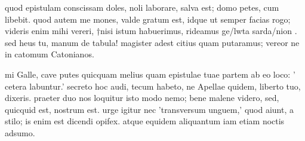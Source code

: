 


 quod epistulam conscissam doles, noli laborare, salva est; domo petes, cum libebit. quod autem me mones, valde gratum est, idque ut semper facias rogo; videris enim mihi vereri, †nisi istum habuerimus, rideamus ge/lwta sarda/nion . sed heus tu, manum de tabula! magister adest citius quam putaramus; vereor ne in catomum Catonianos.

 mi Galle, cave putes quicquam melius quam epistulae tuae partem ab eo loco: ' cetera labuntur.' secreto hoc audi, tecum habeto, ne Apellae quidem, liberto tuo, dixeris. praeter duo nos loquitur isto modo nemo; bene malene videro, sed, quicquid est, nostrum est. urge igitur nec 'transversum unguem,' quod aiunt, a stilo; is enim est dicendi opifex. atque equidem aliquantum iam etiam noctis adsumo.
